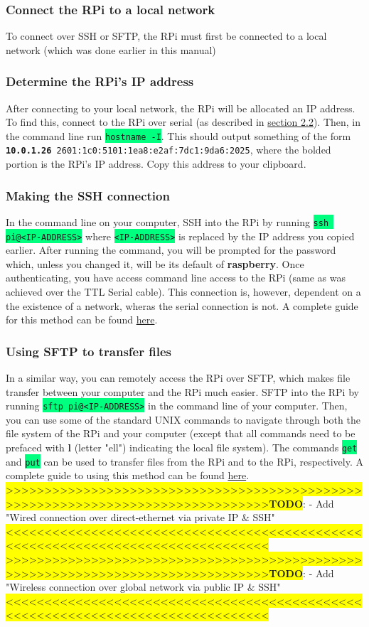 \documentclass{article}
\newcommand{\codei}[1]{\colorbox{SpringGreen}{\texttt{#1}}} %
\newcommand{\outputi}[1]{\colorbox{light-gray}{\texttt{#1}}} %
\newcommand{\red}[1]{\textcolor{BrickRed}{#1}} %
\newcommand{\todo}[1]{\newline\noindent\colorbox{Yellow}{>>>>>>>>>>>>>>>>>>>>>>>>>>>>>>>>>>>>>>>>>>>>>>>>>>>>>>>>>>>>>>>>>>>>>>>>>>>>>>>>}\newline\colorbox{Yellow}{\textbf{TODO}}: - #1 \newline \colorbox{Yellow}{<<<<<<<<<<<<<<<<<<<<<<<<<<<<<<<<<<<<<<<<<<<<<<<<<<<<<<<<<<<<<<<<<<<<<<<<<<<<<<<<}\newline}
\begin{document}
    \subsubsection{Connect the RPi to a local network}
    To connect over SSH or SFTP, the RPi must first be connected to a local network (which was done earlier in this manual)
    \subsubsection{Determine the RPi's IP address}
    After connecting to your local network, the RPi will be allocated an IP address. To find this, connect to the RPi over serial (as described in \hyperref[sec:connect-serial]{section 2.2}). Then, in the command line run \codei{hostname -I}. This should output something of the form \outputi{\red{\textbf{10.0.1.26} 2601:1c0:5101:1ea8:e2af:7dc1:9da6:2025}}, where the bolded portion is the RPi's IP address. Copy this address to your clipboard.
    \subsubsection{Making the SSH connection}
    In the command line on your computer, SSH into the RPi by running \codei{ssh pi@\red{<IP-ADDRESS>}} where \codei{\red{<IP-ADDRESS>}} is replaced by the IP address you copied earlier. After running the command, you will be prompted for the password which, unless you changed it, will be its default of \textbf{raspberry}. Once authenticating, you have access command line access to the RPi (same as was achieved over the TTL Serial cable). This connection is, however, dependent on a the existence of a network, wheras the serial connection is not. A complete guide for this method can be found \href{https://www.raspberrypi.org/documentation/remote-access/ssh/}{here}.
    \subsubsection{Using SFTP to transfer files}
    In a similar way, you can remotely access the RPi over SFTP, which makes file transfer between your computer and the RPi much easier. SFTP into the RPi by running \codei{sftp pi@\red{<IP-ADDRESS>}} in the command line of your computer. Then, you can use some of the standard UNIX commands to navigate through both the file system of the RPi and your computer (except that all commands need to be prefaced with \textbf{l} (letter "ell") indicating the local file system). The commands \codei{get} and \codei{put} can be used to transfer files from the RPi and to the RPi, respectively. A complete guide to using this method can be found \href{https://www.digitalocean.com/community/tutorials/how-to-use-sftp-to-securely-transfer-files-with-a-remote-server}{here}.
    \todo{Add "Wired connection over direct-ethernet via private IP \& SSH"}
    \todo{Add "Wireless connection over global network via public IP \& SSH"}
\end{document}
